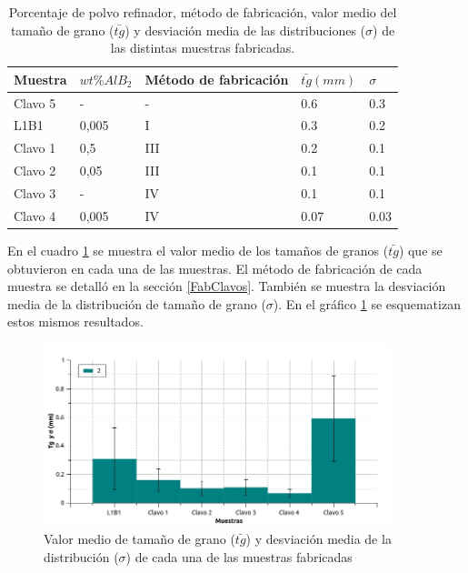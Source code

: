 \documentclass[a4paper,12pt,fleqn,twoside,openany]{book}
\begin{document}
\begin{table} 
\begin{center} 
\begin{tabular}{@{}lllll@{}} \toprule
Muestra & $wt \% AlB_2$ & Método de fabricación & $\bar{tg} (mm)$ & $\sigma$ \\ \midrule
 Clavo 5 &  -   & - & 0.6 & 0.3   \\
 L1B1    &  0,005 & I   & 0.3 & 0.2  \\
 Clavo 1 &  0,5   & III & 0.2 & 0.1   \\
 Clavo 2 &  0,05  & III & 0.1 & 0.1   \\
 Clavo 3 &  -     & IV  & 0.1   & 0.1   \\
 Clavo 4 &  0,005 & IV  & 0.07 & 0.03   \\
\bottomrule
\end{tabular}
\caption{Porcentaje de polvo refinador, método de fabricación, valor medio del tamaño de grano ($\bar{tg}$) y desviación media de las distribuciones ($\sigma$) de las distintas muestras fabricadas.}
\label{tab:ResClavos}
\end{center}
\end{table}


En el cuadro \ref{tab:ResClavos} se muestra el valor medio de los tamaños de granos ($\bar{tg}$) que se obtuvieron en cada una de las muestras. El método de fabricación de cada muestra se detalló en la sección \ref{FabClavos}. También se muestra la desviación media de la distribución de tamaño de grano ($\sigma$). En el gráfico \ref{fig:tamaños} se esquematizan estos mismos resultados.

 \begin{figure}[h]
 \centering
 \includegraphics[width=0.9\textwidth]{Img/Resultados/clavos/TamGranos.jpg}
 \caption{Valor medio de tamaño de grano ($\bar{tg}$) y desviación media de la distribución ($\sigma$) de cada una de las muestras fabricadas} 
 \label{fig:tamaños}
 \end{figure}
\end{document}
